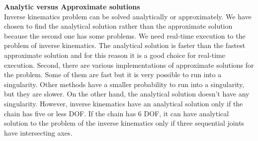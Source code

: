 \textbf{Analytic versus Approximate solutions}\\
Inverse kinematics problem can be solved analytically or approximately. We have chosen to find the analytical solution rather than the approximate solution because the second one has some problems. We need real-time execution to the problem of inverse kinematics. The analytical solution is faster than the fastest approximate solution and for this reason it is a good choice for real-time execution. Second, there are various implementations of approximate solutions for the problem. Some of them are fast but it is very possible to run into a singularity. Other methods have a smaller probability to run into a singularity, but they are slower. On the other hand, the analytical solution doesn't have any singularity. However, inverse kinematics have an analytical solution only if the chain has five or less DOF. If the chain has 6 DOF, it can have analytical solution to the problem of the inverse kinematics only if three sequential joints have intersecting axes.

